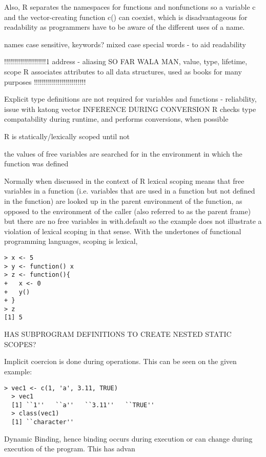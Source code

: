 \documentclass[12pt]{article}
\begin{document}
Also, R separates the namespaces for functions and nonfunctions so a variable c and the vector-creating function c() can coexist, which is disadvantageous for readability as programmers have to be aware of the different uses of a name.


names
case sensitive, keywords?
mixed case
special words - to aid readability


!!!!!!!!!!!!!!!!!!!!!1
address - aliasing SO FAR WALA MAN,
value, type, lifetime, scope
  R associates attributes to all data structures, used as books for many purposes
  !!!!!!!!!!!!!!!!!!!!!!!!!!



Explicit type definitions are not required for variables and functions
- reliability, issue with katong vector
INFERENCE DURING CONVERSION
  R checks type compatability during runtime, and performs conversions, when possible

  R is statically/lexically scoped until not

  the values of free variables are searched for in the environment in which the function was defined


Normally when discussed in the context of R lexical scoping means that free variables in a function (i.e. variables that are used in a function but not defined in the function) are looked up in the parent environment of the function, as opposed to the environment of the caller (also referred to as the parent frame) but there are no free variables in with.default so the example does not illustrate a violation of lexical scoping in that sense.
  With the undertones of functional programming languages, scoping is lexical,

\begin{lstlisting}[frame=single]
> x <- 5
> y <- function() x
> z <- function(){
+   x <- 0
+   y()
+ }
> z
[1] 5
\end{lstlisting}

  HAS SUBPROGRAM DEFINITIONS TO CREATE NESTED STATIC SCOPES?

Implicit coercion is done during operations. This can be seen on the given example:

\begin{lstlisting}[frame=single]
  > vec1 <- c(1, 'a', 3.11, TRUE)
  > vec1
  [1] ``1''   ``a''   ``3.11''   ``TRUE''
  > class(vec1)
  [1] ``character''
\end{lstlisting}

  Dynamic Binding, hence binding occurs during execution or can change during execution of the program. This has advan
\end{document}
